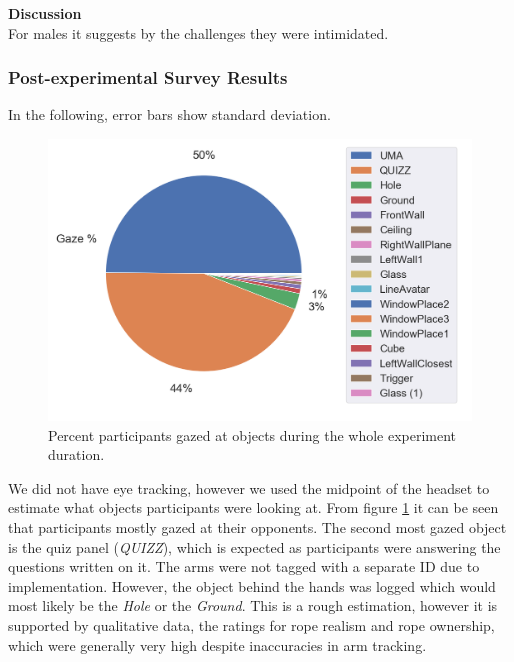 \textbf{Discussion}
\\
For males it suggests by the challenges they were intimidated.


\clearpage

\subsubsection{Post-experimental Survey Results}

In the following, error bars show standard deviation.
\begin{figure}[H]
 \centering
 \includegraphics[scale=0.5]{Files/Plots/gaze_plots.png}
 \caption{Percent participants gazed at objects during the whole experiment duration. }
\label{fig:gazePie}
\end{figure}
We did not have eye tracking, however we used the midpoint of the headset to estimate what objects participants were looking at. From figure \ref{fig:gazePie} it can be seen that participants mostly gazed at their opponents. The second most gazed object is the quiz panel (\textit{QUIZZ}), which is expected as participants were answering the questions written on it.  The arms were not tagged with a separate ID due to implementation. However, the object behind the hands was logged which would most likely be the \textit{Hole} or the \textit{Ground}. This is a rough estimation, however it is supported by qualitative data, the ratings for rope realism and rope ownership, which were generally very high despite inaccuracies in arm tracking.\\ 
